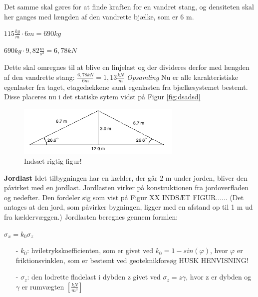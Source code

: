 Det samme skal gøres for at finde kraften for en vandret stang, og densiteten skal her ganges med længden af den vandrette bjælke, som er 6 m.
\begin{center}
	$115\frac{kg}{m}\cdot 6m = 690 kg$
\end{center}

\begin{center}
	$690 kg \cdot 9,\!82\frac{m}{s^2} = 6,\!78  kN$
\end{center}

Dette skal omregnes til at blive en linjelast og der divideres derfor med længden af den vandrette stang:
$\frac{6,\! 78 kN}{6m} = 1,\! 13\frac{kN}{m}$
\newline
\newline
\textit{Opsamling}
\newline
Nu er alle karakteristiske egenlaster fra taget, etagedækkene samt egenlasten fra bjælkesystemet bestemt. Disse placeres nu i det statiske sytem vidst på Figur \ref{fig:dsadsd}

\begin{figure}[htbp]
	\centering
	\includegraphics[width=0.7\textwidth]{billeder/Tagmedvinkel.png}
	\caption{Indsæt rigtig figur!}
\end{figure}

\textbf{Jordlast}
\newline
Idet tilbygningen har en kælder, der går 2 m under jorden, bliver den påvirket med en jordlast. Jordlasten virker på konstruktionen fra jordoverfladen og nedefter. Den fordeler sig som vist på Figur XX
\newline
\newline
INDSÆT FIGUR...... (Det antages at den jord, som påvirker bygningen, ligger med en afstand op til 1 m ud fra kældervæggen.)
\newline
\newline
Jordlasten beregnes gennem formlen:
\begin{center}
	$\sigma_x = k_0 \sigma_z$
\end{center}

\begin{itemize}
	\item[-] $k_0$: hviletrykskoefficienten, som er givet ved $k_0 = 1-sin(\varphi)$, hvor $\varphi$ er friktionsvinklen, som er bestemt ved geoteknikforsøg HUSK HENVISNING!
	\item[-] $\sigma_z$: den lodrette fladelast i dybden z givet ved $\sigma_z = z\gamma$, hvor z er dybden og $\gamma$ er rumvægten $[\frac{kN}{m^3}]$
\end{itemize}

